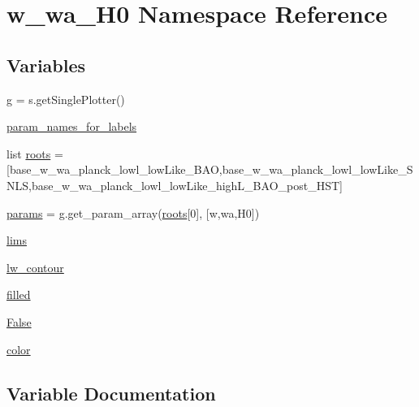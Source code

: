 \hypertarget{namespacew__wa__H0}{}\section{w\+\_\+wa\+\_\+\+H0 Namespace Reference}
\label{namespacew__wa__H0}
\subsection*{Variables}
\begin{DoxyCompactItemize}
\item 
\mbox{\hyperlink{namespacew__wa__H0_a62b1e009360395b305107b563b322778}{g}} = s.\+get\+Single\+Plotter()
\item 
\mbox{\hyperlink{namespacew__wa__H0_a73f1526cc40274ee2264307535c23319}{param\+\_\+names\+\_\+for\+\_\+labels}}
\item 
list \mbox{\hyperlink{namespacew__wa__H0_ae3a123de93519162471425cd16127700}{roots}} = \mbox{[}\textquotesingle{}base\+\_\+w\+\_\+wa\+\_\+planck\+\_\+lowl\+\_\+low\+Like\+\_\+\+B\+AO\textquotesingle{},\textquotesingle{}base\+\_\+w\+\_\+wa\+\_\+planck\+\_\+lowl\+\_\+low\+Like\+\_\+\+S\+N\+LS\textquotesingle{},\textquotesingle{}base\+\_\+w\+\_\+wa\+\_\+planck\+\_\+lowl\+\_\+low\+Like\+\_\+high\+L\+\_\+\+B\+A\+O\+\_\+post\+\_\+\+H\+ST\textquotesingle{}\mbox{]}
\item 
\mbox{\hyperlink{namespacew__wa__H0_afcab9078d6538a81c7aef66f61d9325f}{params}} = g.\+get\+\_\+param\+\_\+array(\mbox{\hyperlink{namespacew__wa__H0_ae3a123de93519162471425cd16127700}{roots}}\mbox{[}0\mbox{]}, \mbox{[}\textquotesingle{}w\textquotesingle{},\textquotesingle{}wa\textquotesingle{},\textquotesingle{}H0\textquotesingle{}\mbox{]})
\item 
\mbox{\hyperlink{namespacew__wa__H0_af86686eb904ad26964ee638600c64969}{lims}}
\item 
\mbox{\hyperlink{namespacew__wa__H0_a5ea5c73917a46a4b383aeb65fa102caa}{lw\+\_\+contour}}
\item 
\mbox{\hyperlink{namespacew__wa__H0_a718ea69553aeb87041ddfc6a9fa1ffd8}{filled}}
\item 
\mbox{\hyperlink{namespacew__wa__H0_ab660f5bea44c6f5120e36cd20c224543}{False}}
\item 
\mbox{\hyperlink{namespacew__wa__H0_a12c4131e21c89c6aa0a7a7eac97dafcb}{color}}
\end{DoxyCompactItemize}


\subsection{Variable Documentation}
\mbox{\label{namespacew__wa__H0_a12c4131e21c89c6aa0a7a7eac97dafcb}} 
